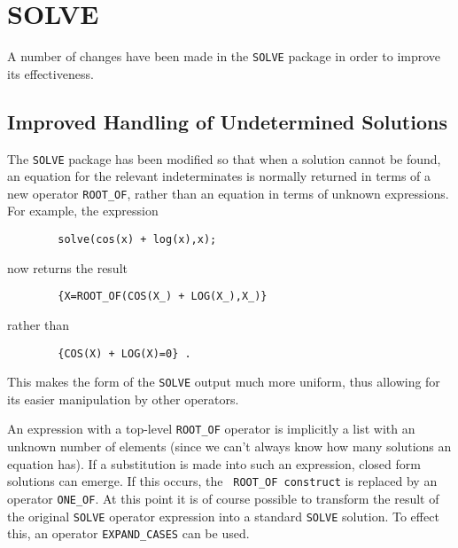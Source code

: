 \section{SOLVE}

A number of changes have been made in the {\tt SOLVE} package in order
to improve its effectiveness.

\subsection{Improved Handling of Undetermined Solutions}

The {\tt SOLVE} package has been modified so that when a solution cannot
be found, an equation for the relevant indeterminates is normally returned
in terms of a new operator {\tt ROOT\_OF}, rather than an equation in
terms of unknown expressions.  For example, the expression
\begin{verbatim}
        solve(cos(x) + log(x),x);
\end{verbatim}
now returns the result
\begin{verbatim}
        {X=ROOT_OF(COS(X_) + LOG(X_),X_)}
\end{verbatim}
rather than
\begin{verbatim}
        {COS(X) + LOG(X)=0} .
\end{verbatim}
This makes the form of the {\tt SOLVE} output much more uniform, thus
allowing for its easier manipulation by other operators.

An expression with a top-level {\tt ROOT\_OF} operator is implicitly a
list with an unknown number of elements (since we can't always know how
many solutions an equation has).  If a substitution is made into such an
expression, closed form solutions can emerge.  If this occurs, the {\tt
ROOT\_OF construct} is replaced by an operator {\tt ONE\_OF}.  At this
point it is of course possible to transform the result of the original
{\tt SOLVE} operator expression into a standard {\tt SOLVE} solution.  To
effect this, an operator {\tt EXPAND\_CASES} can be used.

